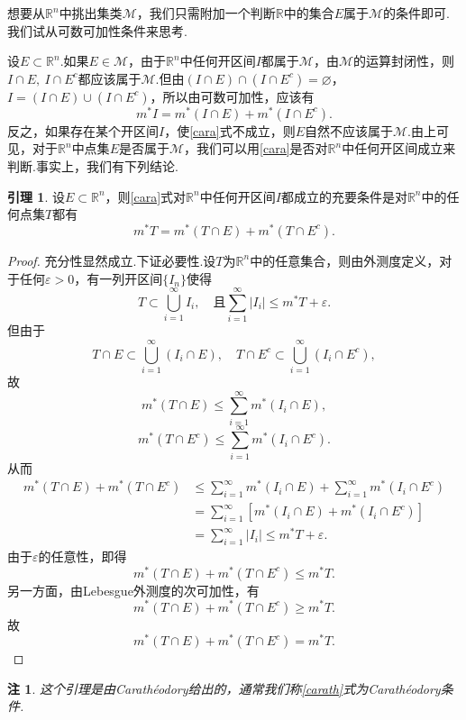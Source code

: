 \documentclass[lang=cn,12pt]{ctexart}
\theoremstyle{definition}
\newtheorem{lemma}{引理}
\theoremstyle{plain}
\newtheorem*{remark}{注}
\begin{document}
想要从$\mathbb{R}^n$中挑出集类$\mathcal{M}$，我们只需附加一个判断$\mathbb{R}$中的集合$E$属于$\mathcal{M}$的条件即可.我们试从可数可加性条件来思考.

设$E\subset \mathbb{R}^n$.如果$E\in\mathcal{M}$，由于$\mathbb{R}^n$中任何开区间$I$都属于$\mathcal{M}$，由$\mathcal{M}$的运算封闭性，则$I\cap E,\ I\cap E^c$都应该属于$\mathcal{M}$.但由$(I\cap E)\cap(I\cap E^c)=\varnothing$，$I=(I\cap E)\cup(I\cap E^c)$，所以由可数可加性，应该有
\begin{equation}\label{cara}
	m^*I=m^*(I\cap E)+m^*(I\cap E^c).
\end{equation}
反之，如果存在某个开区间$I$，使\ref{cara}式不成立，则$E$自然不应该属于$\mathcal{M}$.由上可见，对于$\mathbb{R}^n$中点集$E$是否属于$\mathcal{M}$，我们可以用\ref{cara}是否对$\mathbb{R}^n$中任何开区间成立来判断.事实上，我们有下列结论.
\begin{lemma}
	设$E\subset\mathbb{R}^n$，则\ref{cara}式对$\mathbb{R}^n$中任何开区间$I$都成立的充要条件是对$\mathbb{R}^n$中的任何点集$T$都有
	\begin{equation}\label{carath}
		m^*T=m^*(T\cap E)+m^*(T\cap E^c).
	\end{equation}
\end{lemma}
\begin{proof}
	充分性显然成立.下证必要性.设$T$为$\mathbb{R}^n$中的任意集合，则由外测度定义，对于任何$\varepsilon>0$，有一列开区间$\{I_n\}$使得
	$$T\subset\bigcup_{i=1}^{\infty}I_i,\quad\text{且}\sum_{i=1}^{\infty}|I_i|\leqslant m^*T+\varepsilon.$$
	但由于
	$$T\cap E\subset\bigcup_{i=1}^{\infty}(I_i\cap E),\quad T\cap E^c\subset \bigcup_{i=1}^{\infty}(I_i\cap E^c),$$
	故
	$$m^*(T\cap E)\leqslant\sum_{i=1}^{\infty}m^*(I_i\cap E),$$
	$$m^*(T\cap E^c)\leqslant\sum_{i=1}^{\infty}m^*(I_i\cap E^c).$$
	从而
	\begin{align*}
		m^*(T\cap E)+m^*(T\cap E^c)
		&\leqslant\sum_{i=1}^{\infty}m^*(I_i\cap E)+\sum_{i=1}^{\infty}m^*(I_i\cap E^c)\\
		&=\sum_{i=1}^{\infty}\left[m^*(I_i\cap E)+m^*(I_i\cap E^c)\right]\\
		&=\sum_{i=1}^{\infty}|I_i|\leqslant m^*T+\varepsilon.
	\end{align*}
	由于$\varepsilon$的任意性，即得
	$$m^*(T\cap E)+m^*(T\cap E^c)\leqslant m^*T.$$
	另一方面，由Lebesgue外测度的次可加性，有
	$$m^*(T\cap E)+m^*(T\cap E^c)\geqslant m^*T.$$
	故
	$$m^*(T\cap E)+m^*(T\cap E^c)=m^*T.$$
	
\end{proof}
\begin{remark}
	这个引理是由Carath\'eodory给出的，通常我们称\ref{carath}式为Carath\'eodory条件.
\end{remark}
\end{document}
